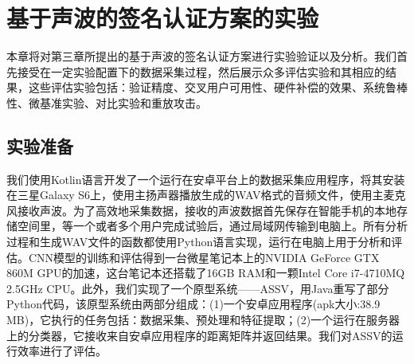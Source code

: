 \chapter{基于声波的签名认证方案的实验}
本章将对第三章所提出的基于声波的签名认证方案进行实验验证以及分析。我们首先接受在一定实验配置下的数据采集过程，然后展示众多评估实验和其相应的结果，这些评估实验包括：验证精度、交叉用户可用性、硬件补偿的效果、系统鲁棒性、微基准实验、对比实验和重放攻击。

\section{实验准备}
我们使用Kotlin语言开发了一个运行在安卓平台上的数据采集应用程序，将其安装在三星Galaxy S6上，使用主扬声器播放生成的WAV格式的音频文件，使用主麦克风接收声波。为了高效地采集数据，接收的声波数据首先保存在智能手机的本地存储空间里，等一个或者多个用户完成试验后，通过局域网传输到电脑上。所有分析过程和生成WAV文件的函数都使用Python语言实现，运行在电脑上用于分析和评估。CNN模型的训练和评估得到一台微星笔记本上的NVIDIA GeForce GTX 860M GPU的加速，这台笔记本还搭载了16GB RAM和一颗Intel Core i7-4710MQ 2.5GHz CPU。此外，我们实现了一个原型系统——ASSV，用Java重写了部分Python代码，该原型系统由两部分组成：(1)一个安卓应用程序(apk大小:38.9 MB)，它执行的任务包括：数据采集、预处理和特征提取；(2)一个运行在服务器上的分类器，它接收来自安卓应用程序的距离矩阵并返回结果。我们对ASSV的运行效率进行了评估。


